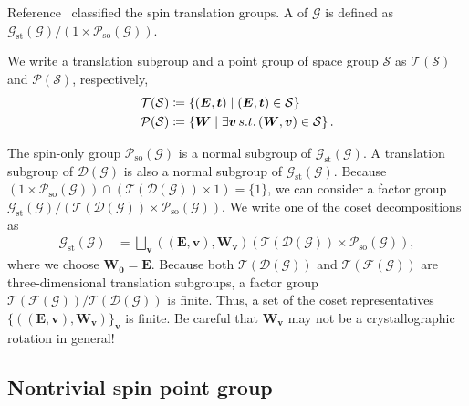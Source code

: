 Reference~\cite{Litvin:a09793} classified the spin translation groups.
A  of $\mathcal{G}$ is defined as $\mathcal{G}_{\mathrm{st}}(\mathcal{G}) / (1 \times \mathcal{P}_{\mathrm{so}}(\mathcal{G}))$.

We write a translation subgroup and a point group of space group $\mathcal{S}$ as $\mathcal{T}(\mathcal{S})$ and $\mathcal{P}(\mathcal{S})$, respectively,
\begin{align}
  \mathcal{T}(\mathcal{S}) &\coloneqq \left\{  (\bm{E}, \bm{t})  \mathrel{}\middle|\mathrel{}  (\bm{E}, \bm{t}) \in \mathcal{S}  \right\} \\
  \mathcal{P}(\mathcal{S}) &\coloneqq \left\{  \bm{W}  \mathrel{}\middle|\mathrel{}  \exists \bm{v} \, s.t.\, (\bm{W}, \bm{v}) \in \mathcal{S}  \right\}.
\end{align}

The spin-only group $\mathcal{P}_{\mathrm{so}}(\mathcal{G})$ is a normal subgroup of $\mathcal{G}_{\mathrm{st}}(\mathcal{G})$.
A translation subgroup of $\mathcal{D}(\mathcal{G})$ is also a normal subgroup of $\mathcal{G}_{\mathrm{st}}(\mathcal{G})$.
Because $(1 \times \mathcal{P}_{\mathrm{so}}(\mathcal{G})) \cap (\mathcal{T}(\mathcal{D}(\mathcal{G})) \times 1) = \{ 1 \}$, we can consider a factor group $\mathcal{G}_{\mathrm{st}}(\mathcal{G}) / ( \mathcal{T}(\mathcal{D}(\mathcal{G})) \times \mathcal{P}_{\mathrm{so}}(\mathcal{G}))$.
We write one of the coset decompositions as
\begin{align}
  \label{eq:spin_translation_group}
  \mathcal{G}_{\mathrm{st}}(\mathcal{G})
    &= \bigsqcup_{ \bm{v} }
        ((\bm{E}, \bm{v}), \bm{W}_{\bm{v}})
        \left(
          \mathcal{T}(\mathcal{D}(\mathcal{G}))
          \times
          \mathcal{P}_{\mathrm{so}}(\mathcal{G})
        \right),
\end{align}
where we choose $\bm{W}_{\bm{0}} = \bm{E}$.
Because both $\mathcal{T}(\mathcal{D}(\mathcal{G}))$ and $\mathcal{T}(\mathcal{F}(\mathcal{G}))$ are three-dimensional translation subgroups, a factor group $\mathcal{T}(\mathcal{F}(\mathcal{G})) / \mathcal{T}(\mathcal{D}(\mathcal{G}))$ is finite.
Thus, a set of the coset representatives $\{ ((\bm{E}, \bm{v}), \bm{W}_{\bm{v}}) \}_{\bm{v}}$ is finite.
Be careful that $\bm{W}_{\bm{v}}$ may not be a crystallographic rotation in general!

\subsection{Nontrivial spin point group}

